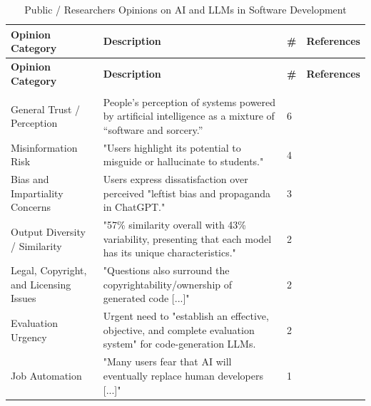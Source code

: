 {\footnotesize
\begin{longtable}{>{\raggedright\arraybackslash}p{3cm} p{9cm} p{0.2cm} >{\raggedright\arraybackslash}p{1.8cm}}
\caption{Public / Researchers Opinions on AI and LLMs in Software Development}
\label{tab:stakeholder_opinions_public} \\

\toprule
\textbf{Opinion Category} & \textbf{Description} & \textbf{\#} & \textbf{References} \\
\midrule
\endfirsthead

\toprule
\textbf{Opinion Category} & \textbf{Description} & \textbf{\#} & \textbf{References} \\
\midrule
\endhead

\midrule
\multicolumn{4}{r}{\textit{Continued on next page}}\\
\bottomrule
\endfoot

\bottomrule
\endlastfoot

General Trust / Perception & People’s perception of systems powered by artificial intelligence as a mixture of “software and sorcery.” \cite{Ahmed:2025ai} & 6 & \cite{Bai:2025ci, Ahmed:2025ai, Basha:2025tt, Pendyala:2025pi, Zamfiroiu:2025ec, Ramos:2025aa} \\ \addlinespace
Misinformation Risk & "Users highlight its potential to misguide or hallucinate to students." \cite{Basha:2025tt} & 4 & \cite{Jabrw:2025ss, Durrani:2024ad, Basha:2025tt, Banh:2025cf} \\ \addlinespace
Bias and Impartiality Concerns & Users express dissatisfaction over perceived "leftist bias and propaganda in ChatGPT." \cite{Basha:2025tt} & 3 & \cite{Ramos:2025aa, Basha:2025tt, Ahmed:2025ai} \\ \addlinespace
Output Diversity / Similarity & "57\% similarity overall with 43\% variability, presenting that each model has its unique characteristics." \cite{Kim:2025ao} & 2 & \cite{Zhang:2025ea, Kim:2025ao} \\ \addlinespace
Legal, Copyright, and Licensing Issues & "Questions also surround the copyrightability/ownership of generated code [...]" \cite{Ahmed:2025ai} & 2 & \cite{Ahmed:2025ai, Basha:2025tt} \\ \addlinespace
Evaluation Urgency & Urgent need to "establish an effective, objective, and complete evaluation system" for code-generation LLMs. \cite{Ahmed:2025ai} & 2 & \cite{Ahmed:2025ai, Pendyala:2025pi} \\ \addlinespace
Job Automation & "Many users fear that AI will eventually replace human developers [...]" \cite{Basha:2025tt} & 1 & \cite{Basha:2025tt} \\

\end{longtable}
}



